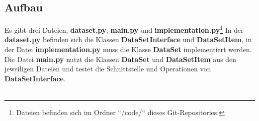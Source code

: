 \documentclass[
 12pt, %
 a4paper, %
 parskip=full %
]{scrartcl}
\begin{document}
\subsection{Aufbau} 
Es gibt drei Dateien, \textbf{dataset.py}, \textbf{main.py} und \textbf{implementation.py}\footnote{Dateien befinden sich im Ordner ``/code/`` dieses Git-Repositories.}
In der \textbf{dataset.py} befinden sich die Klassen \textbf{DataSetInterface} und \textbf{DataSetItem},
in der Datei \textbf{implementation.py} muss die Klasse \textbf{DataSet} implementiert werden.
Die Datei \textbf{main.py} nutzt die Klassen \textbf{DataSet} und \textbf{DataSetItem} aus den jeweiligen Dateien und testet die Schnittstelle und Operationen von \textbf{DataSetInterface}.\\
\\
\end{document}
